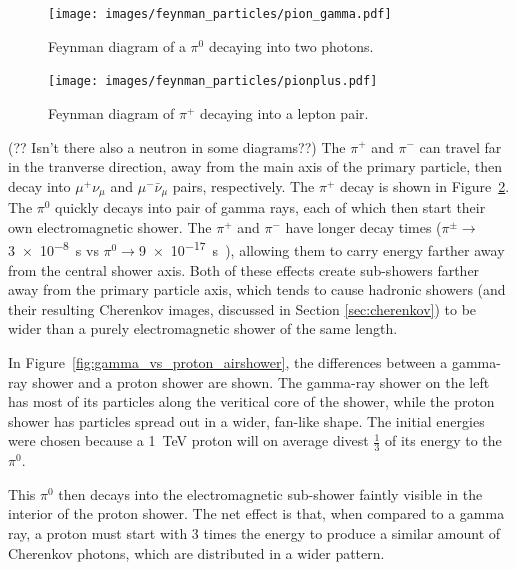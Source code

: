   \begin{figure}[ht]
    \centering
    \texttt{[image: images/feynman\_particles/pion\_gamma.pdf]}
    \caption[Feynman Diagram of $\pi^{0}$ Decay]{
      Feynman diagram of a $\pi^{0}$ decaying into two photons.
      \CaptionBlankLine
    }
    \label{fig:feynman_pi0}
  \end{figure}

  \begin{figure}[ht]
    \centering
    \texttt{[image: images/feynman\_particles/pionplus.pdf]}
    \caption[Feynman Diagram of $\pi^{+}$ Decay]{
      Feynman diagram of $\pi^{+}$ decaying into a lepton pair.
      \CaptionBlankLine
    }
    \label{fig:feynman_piplus}
  \end{figure}
  
  {\color{red}(?? Isn't there also a neutron in some diagrams??)}
  The $\pi^{+}$ and $\pi^{-}$ can travel far in the tranverse direction, away from the main axis of the primary particle, then decay into $\mu^{+}\nu_{\mu}$ and $\mu^{-}\bar{\nu}_{\mu}$ pairs, respectively.
  The $\pi^{+}$ decay is shown in Figure~\ref{fig:feynman_piplus}.
  The $\pi^{0}$ quickly decays into pair of gamma rays, each of which then start their own electromagnetic shower.
  The $\pi^{+}$ and $\pi^{-}$ have longer decay times ($\pi^{\pm} \rightarrow $\SI{3e-8}{s} vs $\pi^{0} \rightarrow $\SI{9e-17}{s}~\cite{pdg_2014}), allowing them to carry energy farther away from the central shower axis.
  Both of these effects create sub-showers farther away from the primary particle axis, which tends to cause hadronic showers (and their resulting Cherenkov images, discussed in Section \ref{sec:cherenkov}) to be wider than a purely electromagnetic shower of the same length. 
  
  In Figure~\ref{fig:gamma_vs_proton_airshower}, the differences between a gamma-ray shower and a proton shower are shown.
  The gamma-ray shower on the left has most of its particles along the veritical core of the shower, while the proton shower has particles spread out in a wider, fan-like shape.
  The initial energies were chosen because a \SI{1}{TeV} proton will on average divest $\frac{1}{3}$ of its energy to the $\pi^{0}$.

  This $\pi^{0}$ then decays into the electromagnetic sub-shower faintly visible in the interior of the proton shower.
  The net effect is that, when compared to a gamma ray, a proton must start with 3 times the energy to produce a similar amount of Cherenkov photons, which are distributed in a wider pattern.


